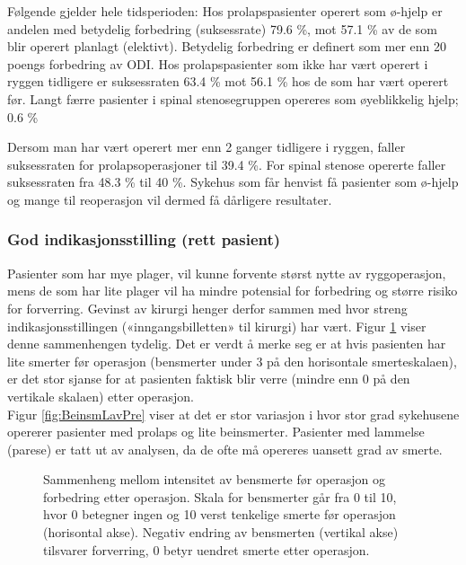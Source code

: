 \documentclass [norsk,a4paper,twoside]{article}\usepackage[]{graphicx}\usepackage[]{color}
\begin{document}
Følgende gjelder hele tidsperioden: Hos prolapspasienter operert som ø-hjelp er andelen med betydelig forbedring (suksessrate)  79.6 \%, mot 57.1 \% av de som blir operert planlagt (elektivt). Betydelig forbedring er definert som mer enn 20 poengs forbedring av ODI.
Hos prolapspasienter som ikke har vært operert i ryggen tidligere er suksessraten 63.4 \% mot 56.1 \%
hos de som har vært operert før. 
Langt færre pasienter i spinal stenosegruppen opereres som øyeblikkelig hjelp; 0.6 \%

Dersom man har vært operert mer enn 2 ganger tidligere i
ryggen, faller suksessraten for prolapsoperasjoner til 39.4 \%. 
For spinal stenose opererte faller suksessraten fra 48.3 \% til 40 \%. 
Sykehus som får henvist få pasienter som ø-hjelp og
mange til reoperasjon vil dermed få dårligere resultater.



\subsubsection{God indikasjonsstilling (rett pasient)}



Pasienter som har mye plager, vil kunne forvente størst nytte av ryggoperasjon,
mens de som har lite plager vil ha mindre potensial for forbedring og større risiko
for forverring. Gevinst av kirurgi henger derfor sammen med hvor streng
indikasjonsstillingen («inngangsbilletten» til kirurgi) har vært. Figur \ref{fig:BeinsmEndrPre} viser denne
sammenhengen tydelig. Det er verdt å merke seg er at hvis pasienten har lite smerter før
operasjon (bensmerter under 3 på den horisontale smerteskalaen), er det stor
sjanse for at pasienten faktisk blir verre (mindre enn 0 på den vertikale skalaen) etter
operasjon. \\
Figur \ref{fig:BeinsmLavPre} viser at det er stor variasjon i hvor stor grad sykehusene opererer
pasienter med prolaps og lite beinsmerter. Pasienter med lammelse (parese) er tatt
ut av analysen, da de ofte må opereres uansett grad av smerte.



\begin{figure}[ht]
\caption{\label{fig:BeinsmEndrPre}  Sammenheng mellom intensitet av bensmerte før operasjon og
forbedring etter operasjon. Skala for bensmerter går fra 0 til 10, hvor 0 betegner
ingen og 10 verst tenkelige smerte før operasjon (horisontal akse). Negativ endring
av bensmerten (vertikal akse) tilsvarer forverring, 0 betyr uendret smerte etter
operasjon.}
\end{figure}
\end{document}
